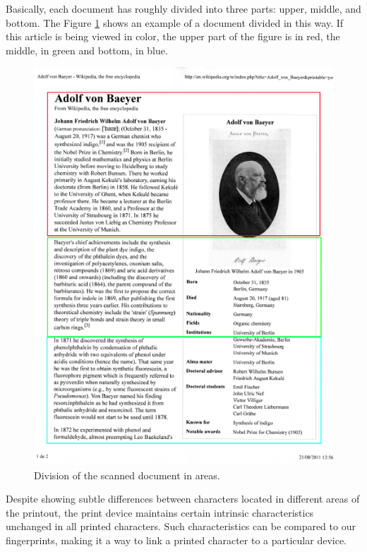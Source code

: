 \documentclass[10pt,twocolumn,letterpaper]{article}
\begin{document}
Basically, each document has roughly divided into three parts: upper, middle, and bottom. The Figure \ref{fig:document_areas} shows an example of a document divided in this way. If this article is being viewed in color, the upper part of the figure is in red, the middle, in green and bottom, in blue.

\begin{figure}
\begin{center}
	\includegraphics[width=0.99\columnwidth]{document_areas}
	\caption{Division of the scanned document in areas.}
\label{fig:document_areas}   
\end{center} 
\end{figure}

Despite showing subtle differences between characters located in different areas of the printout, the print device maintains certain intrinsic characteristics unchanged in all printed characters. Such characteristics can be compared to our fingerprints, making it a way to link a printed character to a particular device.
\end{document}
